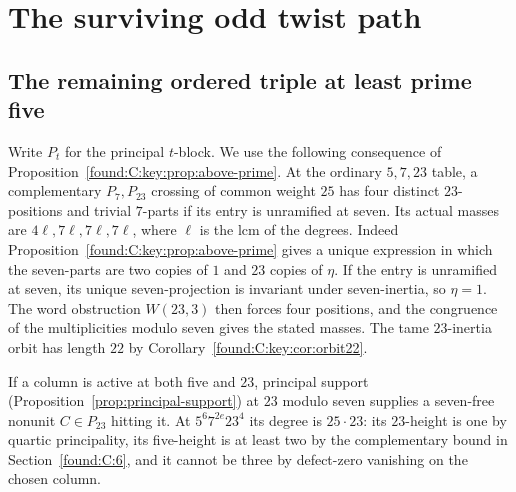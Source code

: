 \documentclass[11pt,a4paper]{article}
\numberwithin{equation}{section}
\theoremstyle{remark}
\begin{document}
\section{The surviving odd twist path}\label{found:group:odd}

\subsection{The remaining ordered triple at least prime five}\label{found:C:4}
Write $P_t$ for the principal $t$-block. We use the following consequence of Proposition~\ref{found:C:key:prop:above-prime}. At the ordinary
$5,7,23$ table, a complementary $P_7,P_{23}$ crossing of common
weight $25$ has four distinct $23$-positions and trivial $7$-parts
if its entry is unramified at seven. Its actual masses are
$4\ell,7\ell,7\ell,7\ell$, where $\ell$ is the lcm of the degrees.
Indeed Proposition~\ref{found:C:key:prop:above-prime} gives a unique expression in which the seven-parts are two copies of $1$ and $23$ copies of $\eta$. If the entry is unramified at seven, its unique seven-projection is invariant under seven-inertia, so $\eta=1$. The word obstruction $W(23,3)$ then forces four positions, and the congruence of the multiplicities modulo seven gives the stated masses. The tame $23$-inertia orbit has length $22$ by Corollary~\ref{found:C:key:cor:orbit22}.

If a column is active at both five and $23$, principal support
(Proposition~\ref{prop:principal-support}) at $23$ modulo seven
supplies a seven-free nonunit $C\in P_{23}$ hitting it.
At $5^6 7^{2e}23^4$ its degree is $25\cdot23$: its $23$-height is
one by quartic principality, its five-height is at least two by the
complementary bound in Section~\ref{found:C:6}, and it cannot be
three by defect-zero vanishing on the chosen column.
\end{document}
